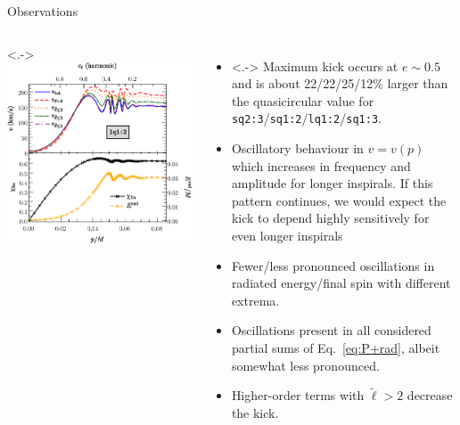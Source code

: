 \documentclass[smaller,aspectratio=169]{beamer}
\newcommand{\tl}{\tilde{\ell}}
\begin{document}
\begin{frame}{Observations}
	\begin{columns}
			\centering
			\only<.->{
				\includegraphics[width=\columnwidth]{kick-q2l-wlabel.eps}
			}
			\begin{itemize}
				\item<.-> 
					\alert{Maximum} kick occurs at $e\sim0.5$ and 
					is about 22/22/25/12\% larger than the 
					quasicircular value for 
					\texttt{sq2:3}/\texttt{sq1:2}/\texttt{lq1:2}/\texttt{sq1:3}.
				\item
					\alert{Oscillatory} behaviour in $v=v(p)$ 
					which increases in 
					frequency and amplitude for longer inspirals. 
					If this pattern continues,
					we would expect the kick to depend 
					\alert{highly sensitively} for even longer inspirals
				\item
					Fewer/less pronounced oscillations in radiated 
					energy/final spin with different extrema.
				\item
					Oscillations present in all considered partial 
					sums of Eq.~\eqref{eq:P+rad},
					albeit somewhat less pronounced.
				\item
					Higher-order terms with $\tl>2$ \alert{decrease} the kick.
			\end{itemize}
	\end{columns}
\end{frame}
\end{document}
